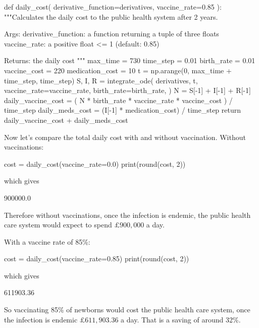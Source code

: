 \begin{pyin}
def daily_cost(
    derivative_function=derivatives, vaccine_rate=0.85
):
    """Calculates the daily cost to the public health system
    after 2 years.

    Args:
        derivative_function: a function returning a tuple
                             of three floats
        vaccine_rate: a positive float <= 1 (default: 0.85)

    Returns:
        the daily cost
    """
    max_time = 730
    time_step = 0.01
    birth_rate = 0.01
    vaccine_cost = 220
    medication_cost = 10
    t = np.arange(0, max_time + time_step, time_step)
    S, I, R = integrate_ode(
        derivatives,
        t,
        vaccine_rate=vaccine_rate,
        birth_rate=birth_rate,
    )
    N = S[-1] + I[-1] + R[-1]
    daily_vaccine_cost = (
        N * birth_rate * vaccine_rate * vaccine_cost
    ) / time_step
    daily_meds_cost = (I[-1] * medication_cost) / time_step
    return daily_vaccine_cost + daily_meds_cost
\end{pyin}

Now let's compare the total daily cost with and without vaccination. Without
vaccinations:

\begin{pyin}
cost = daily_cost(vaccine_rate=0.0)
print(round(cost, 2))
\end{pyin}

which gives

\begin{pyout}
900000.0
\end{pyout}

Therefore without vaccinations, once the infection is endemic, the public health
care system would expect to spend $\pounds 900,000$ a day.

With a vaccine rate of 85\%:

\begin{pyin}
cost = daily_cost(vaccine_rate=0.85)
print(round(cost, 2))
\end{pyin}

which gives

\begin{pyout}
611903.36
\end{pyout}

So vaccinating 85\% of newborns would cost the public health care system, once
the infection is endemic $\pounds 611,903.36$ a day. That is a saving of around
32\%.





